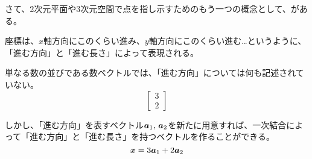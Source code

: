 \documentclass[../imaging-math]{subfiles}
\begin{document}
\br

さて、2次元平面や3次元空間で点を指し示すためのもう一つの概念として、がある。

座標は、$x$軸方向にこのくらい進み、$y$軸方向にこのくらい進む…というように、「進む方向」と「進む長さ」によって表現される。

\br

単なる数の並びである数ベクトルでは、「進む方向」については何も記述されていない。
\begin{equation*}
  \begin{bmatrix}
    3 \\
    2
  \end{bmatrix}
\end{equation*}

しかし、「進む方向」を表すベクトル$\vb*{a}_1,\,\vb*{a}_2$を新たに用意すれば、一次結合によって「進む方向」と「進む長さ」を持つベクトルを作ることができる。
\begin{equation*}
  \vb*{x} = 3 \vb*{a}_1 + 2 \vb*{a}_2
\end{equation*}
\end{document}
